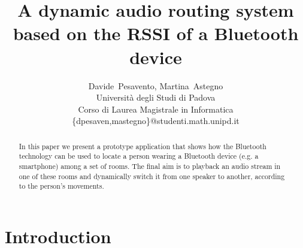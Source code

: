 \documentclass[conference]{IEEEtran}
\title{A dynamic audio routing system\\based on the RSSI of a Bluetooth device}%
\author{Davide~Pesavento, Martina~Astegno \\
	Università degli Studi di Padova \\
	Corso di Laurea Magistrale in Informatica \\
	\{dpesaven,mastegno\}@studenti.math.unipd.it
}
\begin{document}
\maketitle

\begin{abstract}
In this paper we present a prototype application that shows how the Bluetooth technology can be used to locate a person wearing a Bluetooth device (e.g. a smartphone) among a set of rooms. The final aim is to playback an audio stream in one of these rooms and dynamically switch it from one speaker to another, according to the person's movements.
\end{abstract}



\section{Introduction}
\end{document}
